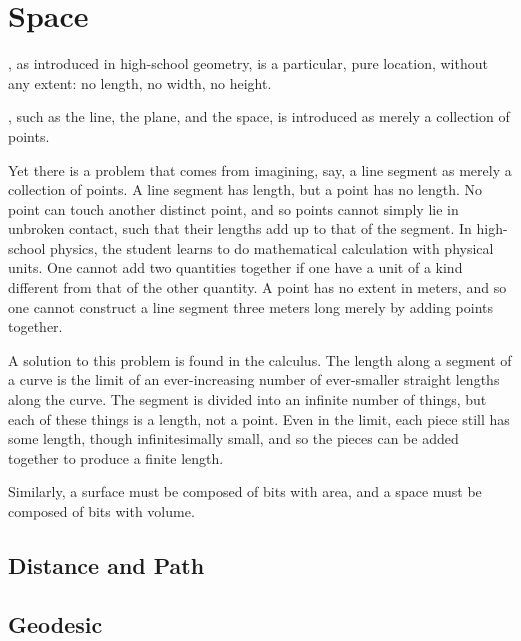 \documentclass{tufte-book}
\begin{document}


\mainmatter

\chapter{Space}
\label{ch:space}

, as introduced in high-school geometry, is a particular,
pure location, without any extent: no length, no width, no height.

, such as the line, the plane, and the
space, is introduced as merely a collection of points.

\bigskip
Yet there is a problem that comes from imagining, say, a line segment as merely
a collection of points.  A line segment has length, but a point has no length.
No point can touch another distinct point, and so points cannot simply lie in
unbroken contact, such that their lengths add up to that of the segment.  In
high-school physics, the student learns to do mathematical calculation with
physical units.  One cannot add two quantities together if one have a unit of a
kind different from that of the other quantity.
A point has no extent in meters, and so one cannot construct a line segment
three meters long merely by adding points together.

A solution to this problem is found in the calculus.  The length along a
segment of a curve is the limit of an ever-increasing number of ever-smaller
straight lengths along the curve.  The segment is divided into an infinite
number of things, but each of these things is a length, not a point.  Even in
the limit, each piece still has some length, though infinitesimally small, and
so the pieces can be added together to produce a finite length.

Similarly, a surface must be composed of bits with area, and a space must be
composed of bits with volume.

\section{Distance and Path}

\section{Geodesic}

\appendix

\backmatter



%
%

\printindex
\end{document}
